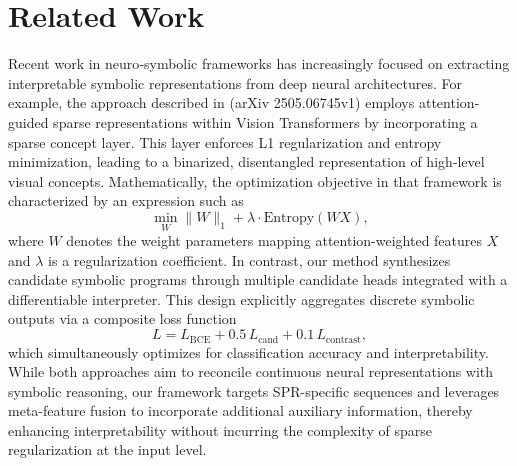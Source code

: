 \documentclass[11pt]{article}
\begin{document}
\section{Related Work}
Recent work in neuro‐symbolic frameworks has increasingly focused on extracting interpretable symbolic representations from deep neural architectures. For example, the approach described in (arXiv 2505.06745v1) employs attention‐guided sparse representations within Vision Transformers by incorporating a sparse concept layer. This layer enforces L1 regularization and entropy minimization, leading to a binarized, disentangled representation of high‐level visual concepts. Mathematically, the optimization objective in that framework is characterized by an expression such as 
\[
\min_{W} \|W\|_1 + \lambda \cdot \text{Entropy}(W X),
\]
where \(W\) denotes the weight parameters mapping attention-weighted features \(X\) and \(\lambda\) is a regularization coefficient. In contrast, our method synthesizes candidate symbolic programs through multiple candidate heads integrated with a differentiable interpreter. This design explicitly aggregates discrete symbolic outputs via a composite loss function 
\[
L = L_{\text{BCE}} + 0.5\, L_{\text{cand}} + 0.1\, L_{\text{contrast}},
\]
which simultaneously optimizes for classification accuracy and interpretability. While both approaches aim to reconcile continuous neural representations with symbolic reasoning, our framework targets SPR-specific sequences and leverages meta-feature fusion to incorporate additional auxiliary information, thereby enhancing interpretability without incurring the complexity of sparse regularization at the input level.
\end{document}

